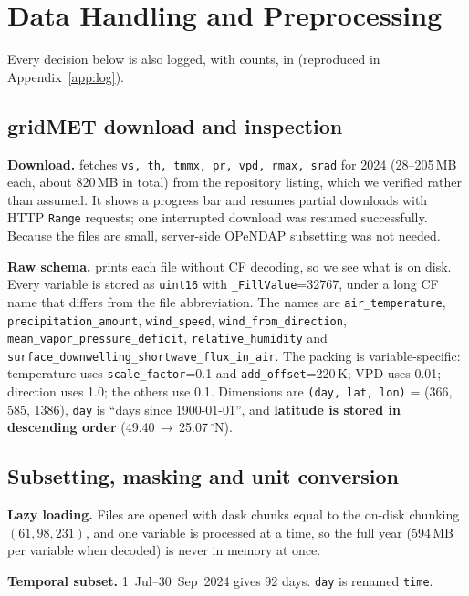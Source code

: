 \section{Data Handling and Preprocessing}
\label{sec:data}
Every decision below is also logged, with counts, in  (reproduced in
Appendix~\ref{app:log}).

\subsection{gridMET download and inspection}
\textbf{Download.}  fetches \texttt{vs, th, tmmx, pr, vpd, rmax, srad} for 2024
(28--205\,MB each, about 820\,MB in total) from the repository listing, which we verified rather than assumed. It shows
a progress bar and resumes partial downloads with HTTP \texttt{Range} requests; one interrupted download was resumed
successfully. Because the files are small, server-side OPeNDAP subsetting was not needed.

\textbf{Raw schema.}  prints each file without CF decoding, so we see what is on disk.
Every variable is stored as \texttt{uint16} with \texttt{\_FillValue}=32767, under a long CF name that differs from the
file abbreviation. The names are \texttt{air\_temperature}, \texttt{precipitation\_amount}, \texttt{wind\_speed},
\texttt{wind\_from\_direction}, \texttt{mean\_vapor\_pressure\_deficit}, \texttt{relative\_humidity} and
\texttt{surface\_downwelling\_shortwave\_flux\_in\_air}. The packing is variable-specific:
temperature uses \texttt{scale\_factor}=0.1 and \texttt{add\_offset}=220\,K; VPD uses 0.01; direction uses 1.0; the
others use 0.1. Dimensions are \texttt{(day, lat, lon)} = (366, 585, 1386), \texttt{day} is ``days since 1900-01-01'',
and \textbf{latitude is stored in descending order} (49.40\,$\rightarrow$\,25.07\,$^\circ$N).

\subsection{Subsetting, masking and unit conversion}
\textbf{Lazy loading.} Files are opened with dask chunks equal to the on-disk chunking $(61, 98, 231)$, and one variable
is processed at a time, so the full year (594\,MB per variable when decoded) is never in memory at once.

\textbf{Temporal subset.} 1~Jul--30~Sep~2024 gives 92 days. \texttt{day} is renamed \texttt{time}.

